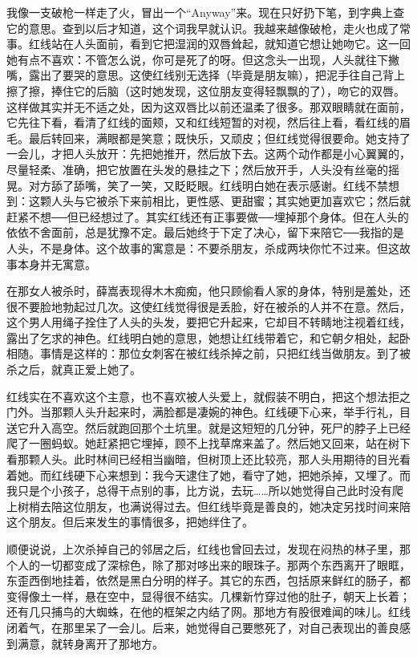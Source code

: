 我像一支破枪一样走了火，冒出一个“Anyway”来。现在只好扔下笔，到字典上查它的意思。查到以后才知道，这个词我早就认识。我越来越像破枪，走火也成了常事。红线站在人头面前，看到它把湿润的双唇耸起，就知道它想让她吻它。这一回她有点不喜欢：不管怎么说，你可是死了的呀。但这念头一出现，人头就往下撇嘴，露出了要哭的意思。这使红线别无选择（毕竟是朋友嘛），把泥手往自己背上擦了擦，捧住它的后脑（这时她发现，这位朋友变得轻飘飘的了），吻它的双唇。这样做其实并无不适之处，因为这双唇比以前还温柔了很多。那双眼睛就在面前，它先往下看，看清了红线的面颊，又和红线短暂的对视，然后往上看，看红线的眉毛。最后转回来，满眼都是笑意；既快乐，又顽皮；但红线觉得很要命。她支持了一会儿，才把人头放开：先把她推开，然后放下去。这两个动作都是小心翼翼的，尽量轻柔、准确，把它放置在头发的悬挂之下；然后放开手，人头没有丝毫的摇晃。对方舔了舔嘴，笑了一笑，又眨眨眼。红线明白她在表示感谢。红线不禁想到：这颗人头与它被杀下来前相比，更性感、更甜蜜；其实她更加喜欢它；然后就赶紧不想──但已经想过了。其实红线还有正事要做──埋掉那个身体。但在人头的依依不舍面前，总是犹豫不定。最后她终于下定了决心，留下来陪它──我指的是人头，不是身体。这个故事的寓意是：不要杀朋友，杀成两块你忙不过来。但这故事本身并无寓意。 

在那女人被杀时，薛嵩表现得木木痴痴，他只顾偷看人家的身体，特别是羞处，还很不要脸地勃起过几次。这使红线觉得很是丢脸，好在被杀的人并不在意。然后，这个男人用绳子拴住了人头的头发，要把它升起来，它却目不转睛地注视着红线，露出了乞求的神色。红线明白她的意思，她想让红线带着它，和它朝夕相处，起卧相随。事情是这样的：那位女刺客在被红线杀掉之前，只把红线当做朋友。到了被杀之后，就真正爱上她了。 

红线实在不喜欢这个主意，也不喜欢被人头爱上，就假装不明白，把这个想法拒之门外。当那颗人头升起来时，满脸都是凄婉的神色。红线硬下心来，举手行礼，目送它升入高空。然后就跑回那个土坑里。就是这短短的几分钟，死尸的脖子上已经爬了一圈蚂蚁。她赶紧把它埋掉，顾不上找草席来盖了。然后她又回来，站在树下看那颗人头。此时林间已经相当幽暗，但树顶上还比较亮，那人头用期待的目光看着她。而红线硬下心来想到：我今天逮住了她，看守了她，把她杀掉，又埋了。而我只是个小孩子，总得干点别的事，比方说，去玩……所以她觉得自己此时没有爬上树梢去陪这位朋友，也满说得过去。但红线毕竟是善良的，她决定另找时间来陪这个朋友。但后来发生的事情很多，把她绊住了。 

顺便说说，上次杀掉自己的邻居之后，红线也曾回去过，发现在闷热的林子里，那个人的一切都变成了深棕色，除了那对哆出来的眼珠子。那两个东西离开了眼眶，东歪西倒地挂着，依然是黑白分明的样子。其它的东西，包括原来鲜红的肠子，都变得像土一样，悬在空中，显得很不结实。几棵新竹穿过他的肚子，朝天上长着；还有几只捕鸟的大蜘蛛，在他的框架之内结了网。那地方有股很难闻的味儿。红线闭着气，在那里呆了一会儿。后来，她觉得自己要憋死了，对自己表现出的善良感到满意，就转身离开了那地方。 

